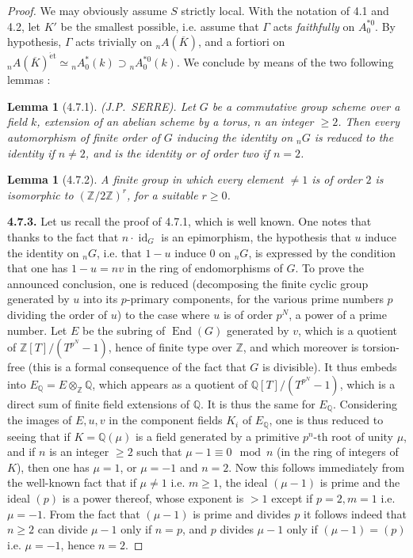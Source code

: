 \documentclass[11pt]{article}
\newtheorem{lemme}[proposition]{Lemma}
\newcommand{\id}{\operatorname{id}}
\newcommand{\ZZ}{\mathbb Z}
\newcommand{\QQ}{\mathbb Q}
\newcommand{\et}{\mathrm{\acute{e}t}}
\newcommand{\End}{\operatorname{End}}
\begin{document}
\begin{proof}
We may obviously assume $S$ strictly local. With the notation of 4.1 and
4.2, let $K'$ be the smallest possible, i.e. assume that $\Gamma$ acts
\emph{faithfully} on $A_0^{\ast 0}$. By hypothesis, $\Gamma$ acts
trivially on ${}_n A(\overline{K})$, and a fortiori on
${}_n A(\overline{K})^{\et} \simeq {}_n A_0^{\ast}(k) \supset
{}_n A_0^{\ast 0}(k)$. We conclude by means of the two following lemmas :

\begin{lemme}[4.7.1]
\emph{(J.P.~SERRE).} Let $G$ be a commutative group scheme over a field
$k$, extension of an abelian scheme by a torus, $n$ an integer $\geq 2$.
Then every automorphism of finite order of $G$ inducing the identity on
${}_n G$ is reduced to the identity if $n \neq 2$, and is the identity
or of order two if $n = 2$.
\end{lemme}

\begin{lemme}[4.7.2]
A finite group in which every element $\neq 1$ is of order $2$ is
isomorphic to $(\ZZ/2\ZZ)^r$, for a suitable $r \geq 0$.
\end{lemme}

\noindent\textbf{4.7.3.} Let us recall the proof of 4.7.1, which is well
known. One notes that thanks to the fact that $n \cdot \id_G$ is an
epimorphism, the hypothesis that $u$ induce the identity on ${}_n G$,
i.e. that $1 - u$ induce $0$ on ${}_n G$, is expressed by the condition
that one has $1 - u = nv$ in the ring of endomorphisms of $G$. To prove
the announced conclusion, one is reduced (decomposing the finite cyclic
group generated by $u$ into its $p$-primary components, for the various
prime numbers $p$ dividing the order of $u$) to the case where $u$ is of
order $p^N$, a power of a prime number. Let $E$ be the subring of
$\End(G)$ generated by $v$, which is a quotient of $\ZZ[T]/(T^{p^N} - 1)$,
hence of finite type over $\ZZ$, and which moreover is torsion-free
(this is a formal consequence of the fact that $G$ is divisible). It
thus embeds into $E_{\QQ} = E \otimes_{\ZZ} \QQ$, which appears as a
quotient of $\QQ[T]/(T^{p^N} - 1)$, which is a direct sum of finite field
extensions of $\QQ$. It is thus the same for $E_{\QQ}$. Considering the
images of $E, u, v$ in the component fields $K_i$ of $E_{\QQ}$, one is
thus reduced to seeing that if $K = \QQ(\mu)$ is a field generated by a
primitive $p^n$-th root of unity $\mu$, and if $n$ is an integer
$\geq 2$ such that $\mu - 1 \equiv 0 \mod n$ (in the ring of integers of
$K$), then one has $\mu = 1$, or $\mu = -1$ and $n = 2$. Now this
follows immediately from the well-known fact that if $\mu \neq 1$ i.e.
$m \geq 1$, the ideal $(\mu - 1)$ is prime and the ideal $(p)$ is a
power thereof, whose exponent is $> 1$ except if $p = 2, m = 1$ i.e.
$\mu = -1$. From the fact that $(\mu - 1)$ is prime and divides $p$ it
follows indeed that $n \geq 2$ can divide $\mu - 1$ only if $n = p$, and
$p$ divides $\mu - 1$ only if $(\mu - 1) = (p)$ i.e. $\mu = -1$, hence
$n = 2$.


\end{proof}
\end{document}
